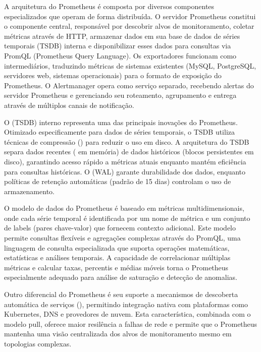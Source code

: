 A arquitetura do Prometheus é composta por diversos componentes especializados que operam de forma distribuída. O servidor Prometheus constitui o componente central, responsável por descobrir alvos de monitoramento, coletar métricas através de  HTTP, armazenar dados em sua base de dados de séries temporais (TSDB) interna e disponibilizar esses dados para consultas via PromQL (Prometheus Query Language). Os exportadores funcionam como intermediários, traduzindo métricas de sistemas existentes (MySQL, PostgreSQL, servidores web, sistemas operacionais) para o formato de exposição do Prometheus. O Alertmanager opera como serviço separado, recebendo alertas do servidor Prometheus e gerenciando seu roteamento, agrupamento e entrega através de múltiplos canais de notificação.

O  (TSDB) interno representa uma das principais inovações do Prometheus. Otimizado especificamente para dados de séries temporais, o TSDB utiliza técnicas de compressão () para reduzir o uso em disco. A arquitetura do TSDB separa dados recentes ( em memória) de dados históricos (blocos persistentes em disco), garantindo acesso rápido a métricas atuais enquanto mantém eficiência para consultas históricas. O  (WAL) garante durabilidade dos dados, enquanto políticas de retenção automáticas (padrão de 15 dias) controlam o uso de armazenamento.

O modelo de dados do Prometheus é baseado em métricas multidimensionais, onde cada série temporal é identificada por um nome de métrica e um conjunto de labels (pares chave-valor) que fornecem contexto adicional. Este modelo permite consultas flexíveis e agregações complexas através do PromQL, uma linguagem de consulta especializada que suporta operações matemáticas, estatísticas e análises temporais. A capacidade de correlacionar múltiplas métricas e calcular taxas, percentis e médias móveis torna o Prometheus especialmente adequado para análise de saturação e detecção de anomalias.

Outro diferencial do Prometheus é seu suporte a mecanismos de descoberta automática de serviços (), permitindo integração nativa com plataformas como Kubernetes, DNS e provedores de nuvem. Esta característica, combinada com o modelo pull, oferece maior resilência a falhas de rede e permite que o Prometheus mantenha uma visão centralizada dos alvos de monitoramento mesmo em topologias complexas.

